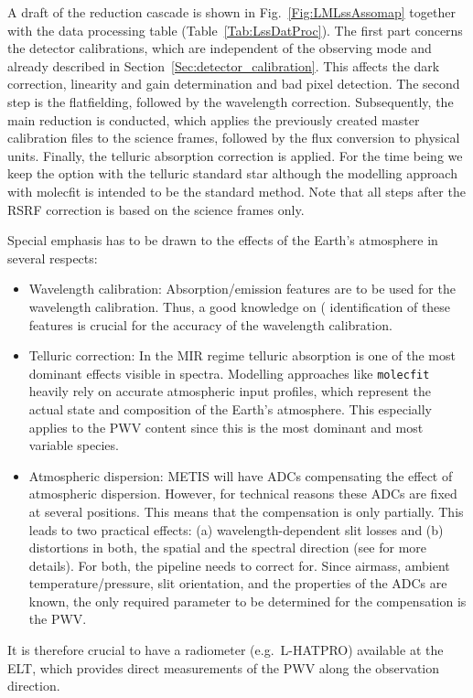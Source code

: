 A draft of the reduction cascade is shown in
Fig.~\ref{Fig:LMLssAssomap} together with the data processing table
(Table~\ref{Tab:LssDatProc}). The first part concerns the detector
calibrations, which are independent of the observing mode and already
described in Section~\ref{Sec:detector_calibration}. This affects the
dark correction, linearity and gain determination and bad pixel
detection. The second step is the flatfielding, followed by the wavelength
correction. Subsequently, the main reduction is conducted, which applies
the previously created master calibration files to the science frames,
followed by the flux conversion to physical units. Finally, the telluric 
absorption correction is applied. For the time being we keep the option with the telluric standard star although the modelling approach with molecfit is intended to be the standard method. Note that all steps after the \ac{RSRF} correction is based on the science frames only.

Special emphasis has to be drawn to the effects of the Earth's
atmosphere in several respects:
\begin{itemize}
\item Wavelength calibration: Absorption/emission features are to be
  used for the wavelength calibration. Thus, a good knowledge on (
  identification of these features is crucial for the accuracy of the
  wavelength calibration.
\item Telluric correction: In the MIR regime telluric absorption is
  one of the most dominant effects visible in spectra. Modelling
  approaches like \texttt{molecfit} heavily rely on accurate
  atmospheric input profiles, which represent the actual state and
  composition of the Earth's atmosphere. This especially applies to
  the \ac{PWV} content since this is the most
  dominant and most variable species.
\item Atmospheric dispersion: \ac{METIS} will have \ac{ADC}s compensating the
  effect of atmospheric dispersion. However, for technical reasons
  these ADCs are fixed at several positions. This means that the
  compensation is only partially. This leads to two practical effects:
  (a) wavelength-dependent slit losses and (b) distortions in both,
  the spatial and the spectral direction (see \cite{METIS-ADC_study}
  for more details). For both, the pipeline needs to correct
  for. Since airmass, ambient temperature/pressure, slit orientation,
  and the properties of the \ac{ADC}s are known, the only required
  parameter to be determined for the compensation is the \ac{PWV}.
\end{itemize}
It is therefore crucial to have a radiometer (e.g.\ L-HATPRO)
available at the \ac{ELT}, which provides direct measurements of the \ac{PWV}
along the observation direction.

